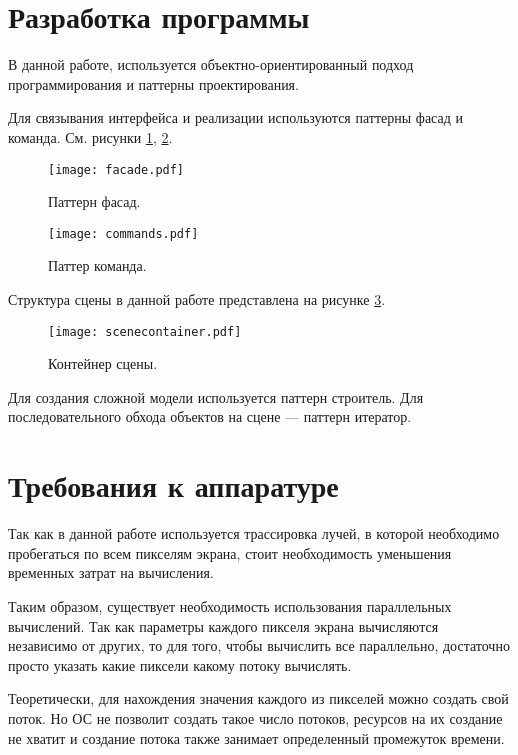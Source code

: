 \section{\textbf{Разработка программы}}

В данной работе, используется объектно-ориентированный подход программирования и паттерны проектирования\cite{patterns}. 

Для связывания интерфейса и реализации используются паттерны фасад и команда. См. рисунки \ref{img:facade}, \ref{img:commands}. 

\begin{figure}[H]
	\centering
	\texttt{[image: facade.pdf]}
	\caption{Паттерн фасад. }
	\label{img:facade}
\end{figure}

\begin{figure}[H]
	\centering
	\texttt{[image: commands.pdf]}
	\caption{Паттер команда. }
	\label{img:commands}
\end{figure}

Структура сцены в данной работе представлена на рисунке \ref{img:scenecontainer}. 

\begin{figure}[H]
	\centering
	\texttt{[image: scenecontainer.pdf]}
	\caption{Контейнер сцены. }
	\label{img:scenecontainer}
\end{figure}

Для создания сложной модели используется паттерн строитель. Для последовательного обхода объектов на сцене --- паттерн итератор. 

\section{\textbf{Требования к аппаратуре }}

Так как в данной работе используется трассировка лучей, в которой необходимо пробегаться по всем пикселям экрана, стоит необходимость уменьшения временных затрат на вычисления. 

Таким образом, существует необходимость использования параллельных вычислений. Так как параметры каждого пикселя экрана вычисляются независимо от других, то для того, чтобы вычислить все параллельно, достаточно просто указать какие пиксели какому потоку вычислять.

Теоретически, для нахождения значения каждого из пикселей можно создать свой поток. Но ОС не позволит создать такое число потоков, ресурсов на их создание не хватит и создание потока также занимает определенный промежуток времени.

